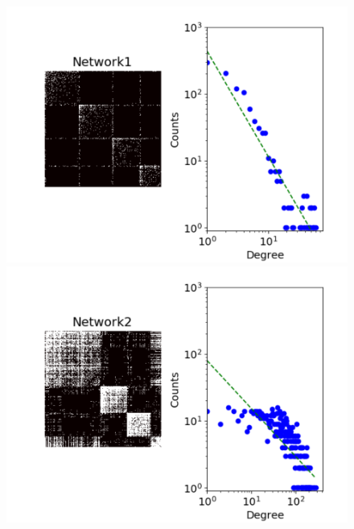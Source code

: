 \begin{figure}[h]
    \centering
        \begin{minipage}{0.4\textwidth}
            \includegraphics[width=\textwidth]{img/corpus/network1_dd}
        \end{minipage}
        \begin{minipage}{0.4\textwidth}
            \includegraphics[width=\textwidth]{img/corpus/network2_dd}
        \end{minipage}
        \begin{minipage}{0.4\textwidth}

\end{minipage}
\end{figure}
